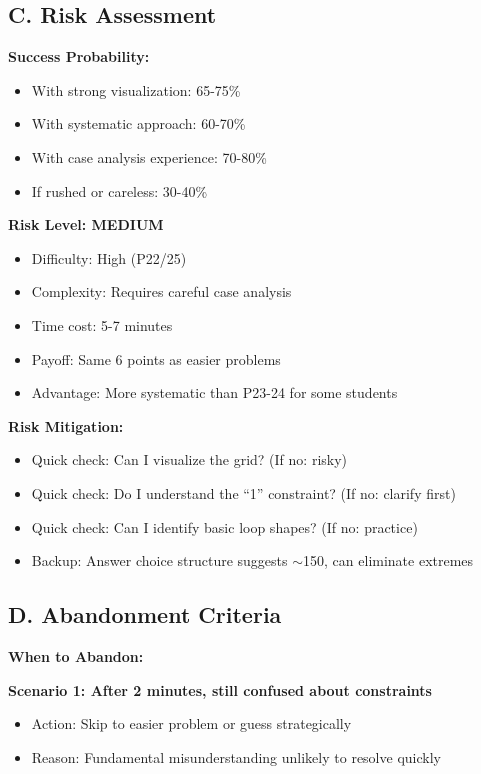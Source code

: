 \documentclass[12pt]{article}
\begin{document}
\begin{competitionbox}
\subsection*{C. Risk Assessment}

\textbf{Success Probability:}
\begin{itemize}
    \item With strong visualization: 65-75\%
    \item With systematic approach: 60-70\%
    \item With case analysis experience: 70-80\%
    \item If rushed or careless: 30-40\%
\end{itemize}

\textbf{Risk Level: MEDIUM}
\begin{itemize}
    \item Difficulty: High (P22/25)
    \item Complexity: Requires careful case analysis
    \item Time cost: 5-7 minutes
    \item Payoff: Same 6 points as easier problems
    \item Advantage: More systematic than P23-24 for some students
\end{itemize}

\textbf{Risk Mitigation:}
\begin{itemize}
    \item Quick check: Can I visualize the grid? (If no: risky)
    \item Quick check: Do I understand the ``1'' constraint? (If no: clarify first)
    \item Quick check: Can I identify basic loop shapes? (If no: practice)
    \item Backup: Answer choice structure suggests $\sim$150, can eliminate extremes
\end{itemize}

\subsection*{D. Abandonment Criteria}

\textbf{When to Abandon:}

\textbf{Scenario 1: After 2 minutes, still confused about constraints}
\begin{itemize}
    \item Action: Skip to easier problem or guess strategically
    \item Reason: Fundamental misunderstanding unlikely to resolve quickly
\end{itemize}


\end{competitionbox}
\end{document}
